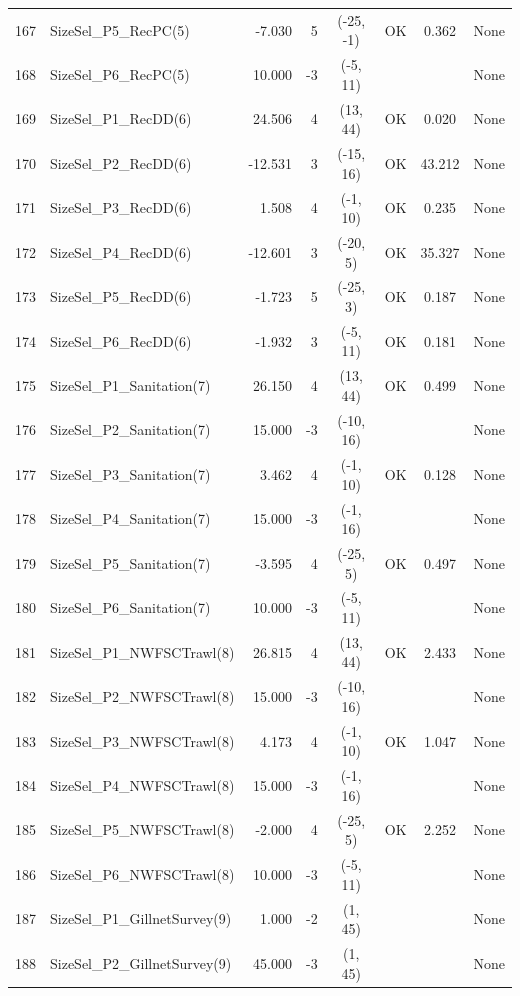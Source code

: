 \documentclass[12pt,]{article}
\begin{document}
\begin{landscape}
\begin{longtable}{rlrrcccl}
  167 & SizeSel\_P5\_RecPC(5) & -7.030 & 5 & (-25, -1) & OK & 0.362 & None \\ 
  168 & SizeSel\_P6\_RecPC(5) & 10.000 & -3 & (-5, 11) &  &  & None \\ 
  169 & SizeSel\_P1\_RecDD(6) & 24.506 & 4 & (13, 44) & OK & 0.020 & None \\ 
  170 & SizeSel\_P2\_RecDD(6) & -12.531 & 3 & (-15, 16) & OK & 43.212 & None \\ 
  171 & SizeSel\_P3\_RecDD(6) & 1.508 & 4 & (-1, 10) & OK & 0.235 & None \\ 
  172 & SizeSel\_P4\_RecDD(6) & -12.601 & 3 & (-20, 5) & OK & 35.327 & None \\ 
  173 & SizeSel\_P5\_RecDD(6) & -1.723 & 5 & (-25, 3) & OK & 0.187 & None \\ 
  174 & SizeSel\_P6\_RecDD(6) & -1.932 & 3 & (-5, 11) & OK & 0.181 & None \\ 
  175 & SizeSel\_P1\_Sanitation(7) & 26.150 & 4 & (13, 44) & OK & 0.499 & None \\ 
  176 & SizeSel\_P2\_Sanitation(7) & 15.000 & -3 & (-10, 16) &  &  & None \\ 
  177 & SizeSel\_P3\_Sanitation(7) & 3.462 & 4 & (-1, 10) & OK & 0.128 & None \\ 
  178 & SizeSel\_P4\_Sanitation(7) & 15.000 & -3 & (-1, 16) &  &  & None \\ 
  179 & SizeSel\_P5\_Sanitation(7) & -3.595 & 4 & (-25, 5) & OK & 0.497 & None \\ 
  180 & SizeSel\_P6\_Sanitation(7) & 10.000 & -3 & (-5, 11) &  &  & None \\ 
  181 & SizeSel\_P1\_NWFSCTrawl(8) & 26.815 & 4 & (13, 44) & OK & 2.433 & None \\ 
  182 & SizeSel\_P2\_NWFSCTrawl(8) & 15.000 & -3 & (-10, 16) &  &  & None \\ 
  183 & SizeSel\_P3\_NWFSCTrawl(8) & 4.173 & 4 & (-1, 10) & OK & 1.047 & None \\ 
  184 & SizeSel\_P4\_NWFSCTrawl(8) & 15.000 & -3 & (-1, 16) &  &  & None \\ 
  185 & SizeSel\_P5\_NWFSCTrawl(8) & -2.000 & 4 & (-25, 5) & OK & 2.252 & None \\ 
  186 & SizeSel\_P6\_NWFSCTrawl(8) & 10.000 & -3 & (-5, 11) &  &  & None \\ 
  187 & SizeSel\_P1\_GillnetSurvey(9) & 1.000 & -2 & (1, 45) &  &  & None \\ 
  188 & SizeSel\_P2\_GillnetSurvey(9) & 45.000 & -3 & (1, 45) &  &  & None \\ 

\end{longtable}
\end{landscape}
\end{document}
